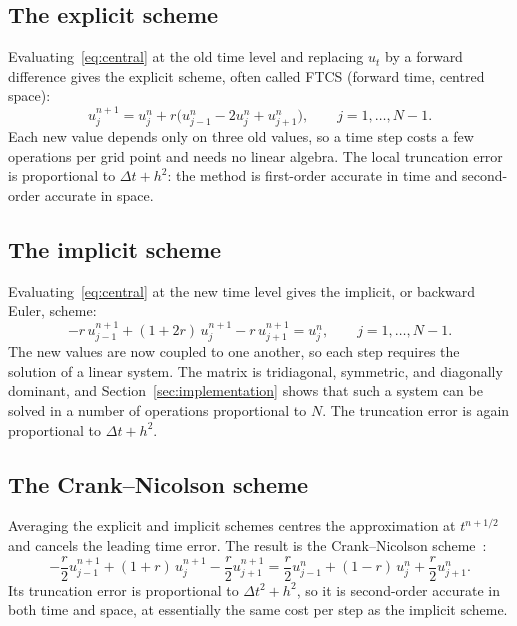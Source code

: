 \documentclass[11pt]{article}
\theoremstyle{definition}
\theoremstyle{remark}
\begin{document}
\subsection{The explicit scheme}

Evaluating~\eqref{eq:central} at the old time level and replacing $u_t$ by a forward difference gives the explicit scheme, often called FTCS (forward time, centred space):
\begin{equation}\label{eq:ftcs}
  u_j^{n+1} = u_j^n + r \bigl( u_{j-1}^n - 2 u_j^n + u_{j+1}^n \bigr),
  \qquad j = 1, \ldots, N-1 .
\end{equation}
Each new value depends only on three old values, so a time step costs a few operations per grid point and needs no linear algebra. The local truncation error is proportional to $\Delta t + h^2$: the method is first-order accurate in time and second-order accurate in space.

\subsection{The implicit scheme}

Evaluating~\eqref{eq:central} at the new time level gives the implicit, or backward Euler, scheme:
\begin{equation}\label{eq:btcs}
  -r \, u_{j-1}^{n+1} + (1 + 2r) \, u_j^{n+1} - r \, u_{j+1}^{n+1} = u_j^n,
  \qquad j = 1, \ldots, N-1 .
\end{equation}
The new values are now coupled to one another, so each step requires the solution of a linear system. The matrix is tridiagonal, symmetric, and diagonally dominant, and Section~\ref{sec:implementation} shows that such a system can be solved in a number of operations proportional to $N$. The truncation error is again proportional to $\Delta t + h^2$.

\subsection{The Crank--Nicolson scheme}

Averaging the explicit and implicit schemes centres the approximation at $t^{n+1/2}$ and cancels the leading time error. The result is the Crank--Nicolson scheme~\cite{crank1947}:
\begin{equation}\label{eq:cn}
  -\frac{r}{2} u_{j-1}^{n+1} + (1 + r) \, u_j^{n+1} - \frac{r}{2} u_{j+1}^{n+1}
  = \frac{r}{2} u_{j-1}^{n} + (1 - r) \, u_j^{n} + \frac{r}{2} u_{j+1}^{n} .
\end{equation}
Its truncation error is proportional to $\Delta t^2 + h^2$, so it is second-order accurate in both time and space, at essentially the same cost per step as the implicit scheme.
\end{document}
